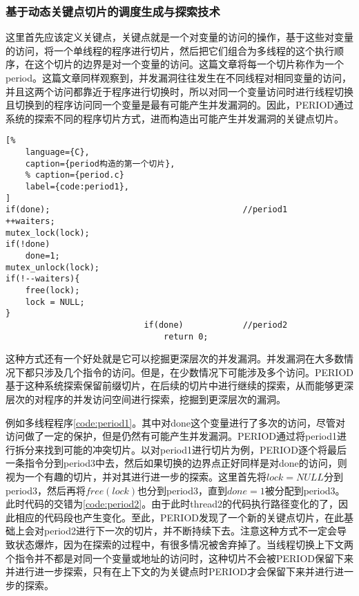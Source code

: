 \subsubsection{基于动态关键点切片的调度生成与探索技术}

这里首先应该定义关键点，关键点就是一个对变量的访问的操作，基于这些对变量的访问，将一个单线程的程序进行切片，然后把它们组合为多线程的这个执行顺序，在这个切片的边界是对一个变量的访问。这篇文章将每一个切片称作为一个period。这篇文章同样观察到，并发漏洞往往发生在不同线程对相同变量的访问，并且这两个访问都靠近于程序进行切换时，所以对同一个变量访问时进行线程切换且切换到的程序访问同一个变量是最有可能产生并发漏洞的。因此，PERIOD通过系统的探索不同的程序切片方式，进而构造出可能产生并发漏洞的关键点切片。

\begin{spacing}{1.0}
\begin{lstlisting}[%
    language={C},
    caption={period构造的第一个切片},
    % caption={period.c}
    label={code:period1},
]
if(done);                                       //period1
++waiters;
mutex_lock(lock); 
if(!done) 
    done=1; 
mutex_unlock(lock); 
if(!--waiters){ 
    free(lock); 
    lock = NULL; 
} 
                            if(done)            //period2
                                return 0;
\end{lstlisting}
\end{spacing}

这种方式还有一个好处就是它可以挖掘更深层次的并发漏洞。并发漏洞在大多数情况下都只涉及几个指令的访问。但是，在少数情况下可能涉及多个访问。PERIOD基于这种系统探索保留前缀切片，在后续的切片中进行继续的探索，从而能够更深层次的对程序的并发访问空间进行探索，挖掘到更深层次的漏洞。

例如多线程程序\autoref{code:period1}。其中对done这个变量进行了多次的访问，尽管对访问做了一定的保护，但是仍然有可能产生并发漏洞。PERIOD通过将period1进行拆分来找到可能的冲突切片。以对period1进行切片为例，PERIOD逐个将最后一条指令分到period3中去，然后如果切换的边界点正好同样是对done的访问，则视为一个有趣的切片，并对其进行进一步的探索。这里首先将$lock = NULL$分到period3，然后再将$free(lock)$也分到period3，直到$done = 1$被分配到period3。此时代码的交错为\autoref{code:period2}。由于此时thread2的代码执行路径变化的了，因此相应的代码段也产生变化。至此，PERIOD发现了一个新的关键点切片，在此基础上会对period2进行下一次的切片，并不断持续下去。注意这种方式不一定会导致状态爆炸，因为在探索的过程中，有很多情况被舍弃掉了。当线程切换上下文两个指令并不都是对同一个变量或地址的访问时，这种切片不会被PERIOD保留下来并进行进一步探索，只有在上下文的为关键点时PERIOD才会保留下来并进行进一步的探索。

